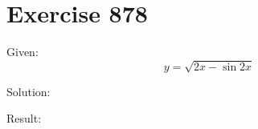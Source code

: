 \documentclass[a4paper, 10pt]{scrartcl}
\begin{document}
\section{Exercise 878}

Given:
\[
y = \sqrt{2x - \sin{2x}}
\]

Solution:

Result:
\end{document}
